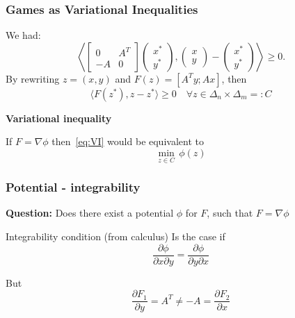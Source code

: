 \documentclass[aspectratio=149]{beamer}
\begin{document}
\begin{frame}
  \frametitle{Games as Variational Inequalities}
  We had:
  \begin{equation}
  \left\langle \begin{bmatrix}
      0 & A^T \\
      -A & 0
    \end{bmatrix}
    \left(\begin{array}{c}
      x^*\\ y^*
    \end{array}  \right),
    \left(\begin{array}{c}
      x \\ y
    \end{array}  \right)
    -
    \left(\begin{array}{c}
      x^* \\
      y^*
    \end{array} \right)
 \right\rangle \ge 0.
  \end{equation}
  By rewriting $z=(x,y)$ and $F(z) = [A^T y; Ax]$, then
  \begin{equation}\tag{VI}
    \label{eq:VI}
    \langle F(z^*), z-z^* \rangle \ge 0 \quad \forall z \in \Delta_n \times \Delta_m =: C
  \end{equation}
  \begin{center}
    \textbf{Variational inequality}
  \end{center}

  \begin{block}{}
  If $F = \nabla \phi$ then~\eqref{eq:VI} would be equivalent to
  \begin{equation}
    \min_{z\in C} \, \phi(z)
  \end{equation}
  \end{block}
\end{frame}

\begin{frame}
  \frametitle{Potential - integrability}

  \textbf{Question:} Does there exist a potential $\phi$ for $F$, such that $F = \nabla \phi$

  \begin{block}{Integrability condition (from calculus)}
    Is the case if
    \begin{equation}
      \frac{\partial \phi}{\partial x \partial y} = \frac{\partial \phi}{\partial y \partial x}
    \end{equation}
  \end{block}
  But
  \begin{equation}
    \frac{\partial F_1}{\partial y} = A^T \neq - A = \frac{\partial F_2}{\partial x}
  \end{equation}
\end{frame}
\end{document}
